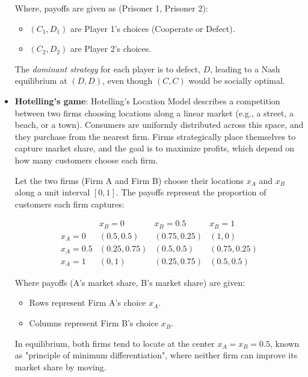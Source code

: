 \documentclass{article}
\begin{document}
\begin{itemize}
        Where, payoffs are given as (Prisoner 1, Prisoner 2):
        \begin{itemize}
            \item $(C_1, D_1)$ are Player 1’s choices (Cooperate or Defect).
            \item $( C_2, D_2)$ are Player 2’s choices.  
        \end{itemize}
        
        The \textit{dominant strategy} for each player is to defect, $D$, leading to a Nash equilibrium at $(D, D)$, even though $(C, C)$ would be socially optimal.
                           
    \item \textbf{Hotelling's game}: Hotelling’s Location Model describes a competition between two firms choosing locations along a linear market (e.g., a street, a beach, or a town). Consumers are uniformly distributed across this space, and they purchase from the nearest firm. Firms strategically place themselves to capture market share, and the goal is to maximize profits, which depend on how many customers choose each firm.

    Let the two firms (Firm A and Firm B) choose their locations \( x_A \) and \( x_B \) along a unit interval \( [0,1] \). The payoffs represent the proportion of customers each firm captures:

        \[
        \begin{array}{c|ccc}
            & x_B = 0 & x_B = 0.5 & x_B = 1 \\
            \hline
            x_A = 0 & (0.5, 0.5) & (0.75, 0.25) & (1,0) \\
            x_A = 0.5 & (0.25, 0.75) & (0.5, 0.5) & (0.75, 0.25) \\
            x_A = 1 & (0,1) & (0.25, 0.75) & (0.5, 0.5)
        \end{array}
        \]

        Where payoffs (A's market share, B's market share) are given: 
        \begin{itemize}
            \item Rows represent Firm A's choice \( x_A \).
            \item Columns represent Firm B's choice \( x_B \).
        \end{itemize}
        
        In equilibrium, both firms tend to locate at the center \( x_A = x_B = 0.5 \), known as "principle of minimum differentiation", where neither firm can improve its market share by moving.
        

\end{itemize}
\end{document}
